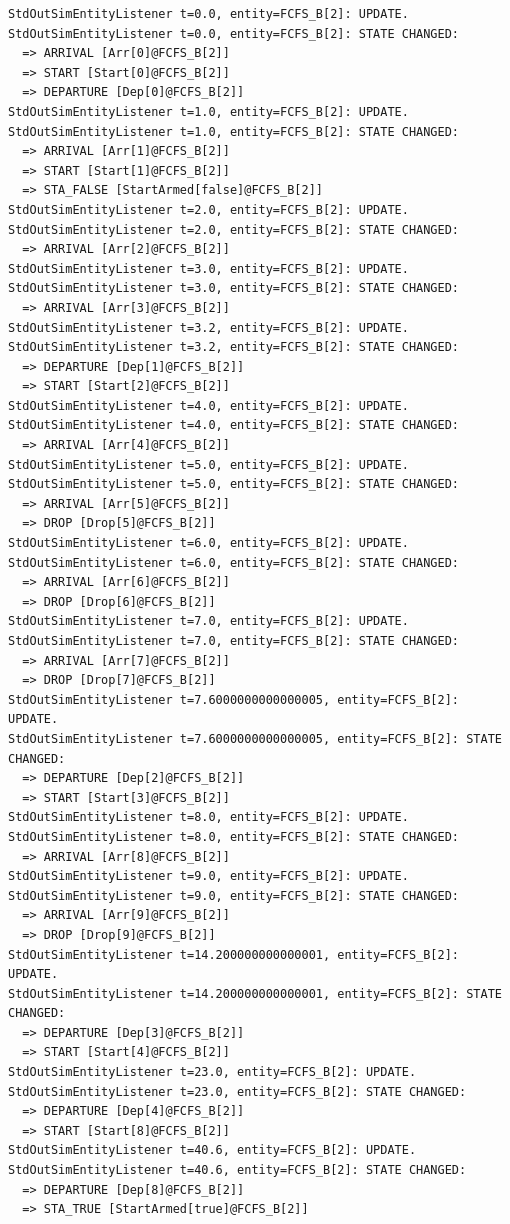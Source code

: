 \documentclass[12pt]{book}
\begin{document}
\begin{lstfloat}
\begin{lstlisting}
StdOutSimEntityListener t=0.0, entity=FCFS_B[2]: UPDATE.
StdOutSimEntityListener t=0.0, entity=FCFS_B[2]: STATE CHANGED:
  => ARRIVAL [Arr[0]@FCFS_B[2]]
  => START [Start[0]@FCFS_B[2]]
  => DEPARTURE [Dep[0]@FCFS_B[2]]
StdOutSimEntityListener t=1.0, entity=FCFS_B[2]: UPDATE.
StdOutSimEntityListener t=1.0, entity=FCFS_B[2]: STATE CHANGED:
  => ARRIVAL [Arr[1]@FCFS_B[2]]
  => START [Start[1]@FCFS_B[2]]
  => STA_FALSE [StartArmed[false]@FCFS_B[2]]
StdOutSimEntityListener t=2.0, entity=FCFS_B[2]: UPDATE.
StdOutSimEntityListener t=2.0, entity=FCFS_B[2]: STATE CHANGED:
  => ARRIVAL [Arr[2]@FCFS_B[2]]
StdOutSimEntityListener t=3.0, entity=FCFS_B[2]: UPDATE.
StdOutSimEntityListener t=3.0, entity=FCFS_B[2]: STATE CHANGED:
  => ARRIVAL [Arr[3]@FCFS_B[2]]
StdOutSimEntityListener t=3.2, entity=FCFS_B[2]: UPDATE.
StdOutSimEntityListener t=3.2, entity=FCFS_B[2]: STATE CHANGED:
  => DEPARTURE [Dep[1]@FCFS_B[2]]
  => START [Start[2]@FCFS_B[2]]
StdOutSimEntityListener t=4.0, entity=FCFS_B[2]: UPDATE.
StdOutSimEntityListener t=4.0, entity=FCFS_B[2]: STATE CHANGED:
  => ARRIVAL [Arr[4]@FCFS_B[2]]
StdOutSimEntityListener t=5.0, entity=FCFS_B[2]: UPDATE.
StdOutSimEntityListener t=5.0, entity=FCFS_B[2]: STATE CHANGED:
  => ARRIVAL [Arr[5]@FCFS_B[2]]
  => DROP [Drop[5]@FCFS_B[2]]
StdOutSimEntityListener t=6.0, entity=FCFS_B[2]: UPDATE.
StdOutSimEntityListener t=6.0, entity=FCFS_B[2]: STATE CHANGED:
  => ARRIVAL [Arr[6]@FCFS_B[2]]
  => DROP [Drop[6]@FCFS_B[2]]
StdOutSimEntityListener t=7.0, entity=FCFS_B[2]: UPDATE.
StdOutSimEntityListener t=7.0, entity=FCFS_B[2]: STATE CHANGED:
  => ARRIVAL [Arr[7]@FCFS_B[2]]
  => DROP [Drop[7]@FCFS_B[2]]
StdOutSimEntityListener t=7.6000000000000005, entity=FCFS_B[2]: UPDATE.
StdOutSimEntityListener t=7.6000000000000005, entity=FCFS_B[2]: STATE CHANGED:
  => DEPARTURE [Dep[2]@FCFS_B[2]]
  => START [Start[3]@FCFS_B[2]]
StdOutSimEntityListener t=8.0, entity=FCFS_B[2]: UPDATE.
StdOutSimEntityListener t=8.0, entity=FCFS_B[2]: STATE CHANGED:
  => ARRIVAL [Arr[8]@FCFS_B[2]]
StdOutSimEntityListener t=9.0, entity=FCFS_B[2]: UPDATE.
StdOutSimEntityListener t=9.0, entity=FCFS_B[2]: STATE CHANGED:
  => ARRIVAL [Arr[9]@FCFS_B[2]]
  => DROP [Drop[9]@FCFS_B[2]]
StdOutSimEntityListener t=14.200000000000001, entity=FCFS_B[2]: UPDATE.
StdOutSimEntityListener t=14.200000000000001, entity=FCFS_B[2]: STATE CHANGED:
  => DEPARTURE [Dep[3]@FCFS_B[2]]
  => START [Start[4]@FCFS_B[2]]
StdOutSimEntityListener t=23.0, entity=FCFS_B[2]: UPDATE.
StdOutSimEntityListener t=23.0, entity=FCFS_B[2]: STATE CHANGED:
  => DEPARTURE [Dep[4]@FCFS_B[2]]
  => START [Start[8]@FCFS_B[2]]
StdOutSimEntityListener t=40.6, entity=FCFS_B[2]: UPDATE.
StdOutSimEntityListener t=40.6, entity=FCFS_B[2]: STATE CHANGED:
  => DEPARTURE [Dep[8]@FCFS_B[2]]
  => STA_TRUE [StartArmed[true]@FCFS_B[2]]

\end{lstlisting}
\end{lstfloat}
\end{document}
